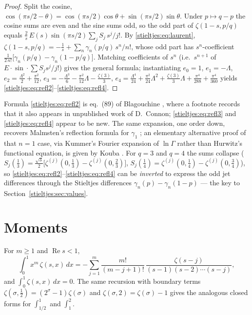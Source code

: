 \begin{proof}
Split the cosine, $\cos(\pi s/2-\theta)=\cos(\pi s/2)\cos\theta
+\sin(\pi s/2)\sin\theta$. Under $p\mapsto q-p$ the cosine sums are even and
the sine sums odd, so the odd part of $\zeta(1-s,p/q)$ equals
$\tfrac2s\,E(s)\sin(\pi s/2)\sum_j S_j\,s^j/j!$. By \eqref{stieltjes:eq:laurent},
$\zeta(1-s,p/q)=-\tfrac1s+\sum_n\gamma_n(p/q)\,s^n/n!$, whose odd part has
$s^n$-coefficient $\tfrac1{2\,n!}\bigl[\gamma_n(p/q)-\gamma_n(1-p/q)\bigr]$.
Matching coefficients of $s^{n}$ (i.e.\ $s^{n+1}$ of
$E\cdot\sin\cdot\sum S_js^j/j!$) gives the general formula; instantiating
$e_0=1$, $e_1=-\Lambda$, $e_2=\tfrac{\Lambda^2}2+\tfrac{\pi^2}{12}$,
$e_3=-\tfrac{\Lambda^3}6-\tfrac{\pi^2}{12}\Lambda-\tfrac{\zeta(3)}3$,
$e_4=\tfrac{\Lambda^4}{24}+\tfrac{\pi^2}{24}\Lambda^2+\tfrac{\zeta(3)}3\Lambda
+\tfrac{\pi^4}{288}+\tfrac{\pi^4}{360}$ yields
\eqref{stieltjes:eq:refl2}--\eqref{stieltjes:eq:refl4}.
\end{proof}

Formula \eqref{stieltjes:eq:refl2} is eq.~(89) of Blagouchine \cite{bridge:BlagouchineJNT},
where a footnote records that it also appears in unpublished work of
D.~Connon; \eqref{stieltjes:eq:refl3} and \eqref{stieltjes:eq:refl4} appear to be new. The same
expansion, one order down, recovers Malmsten's reflection formula for
$\gamma_1$ \cite{bridge:BlagouchineJNT}; an elementary alternative proof of that
$n=1$ case, via Kummer's Fourier expansion of $\ln\Gamma$ rather than
Hurwitz's functional equation, is given by Kouba \cite{stieltjes:Kouba}. For $q=3$
and $q=4$ the sums collapse
($S_j(\tfrac13)=\tfrac{\sqrt3}{2}\bigl[\zeta^{(j)}(0,\tfrac13)-\zeta^{(j)}(0,\tfrac23)\bigr]$,
$S_j(\tfrac14)=\zeta^{(j)}(0,\tfrac14)-\zeta^{(j)}(0,\tfrac34)$), so
\eqref{stieltjes:eq:refl2}--\eqref{stieltjes:eq:refl4} can be \emph{inverted} to express the odd
jet differences through the Stieltjes differences
$\gamma_n(p)-\gamma_n(1-p)$ — the key to Section~\ref{stieltjes:sec:values}.

\section{Moments}\label{stieltjes:sec:moments}

\begin{theorem}\label{stieltjes:thm:transform}
For $m\ge1$ and $\operatorname{Re}s<1$,
\begin{equation}\label{stieltjes:eq:transform}
\int_0^1 x^m\,\zeta(s,x)\,dx
=-\sum_{j=1}^{m}\frac{m!}{(m-j+1)!}\,
\frac{\zeta(s-j)}{(s-1)(s-2)\cdots(s-j)} ,
\end{equation}
and $\int_0^1\zeta(s,x)\,dx=0$. The same recursion with boundary terms
$\zeta(\sigma,\tfrac12)=(2^\sigma-1)\zeta(\sigma)$ and
$\zeta(\sigma,2)=\zeta(\sigma)-1$ gives the analogous closed forms for
$\int_{1/2}^1$ and $\int_1^2$.
\end{theorem}

